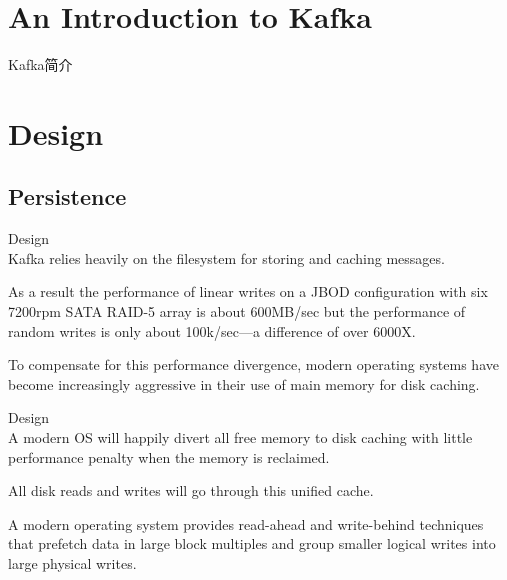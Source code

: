 \section{An Introduction to Kafka}
\begin{frame}[plain,t]{Kafka简介} %
	  \vspace{2ex}

	


	
\end{frame}

\section{Design}
\subsection{Persistence}
\begin{frame}[plain,t]{Design} %
     \\
    \vspace{2ex}
    Kafka relies heavily on the filesystem for storing and caching messages. 
    
    \vspace{2ex}
    As a result the performance of linear writes on a JBOD configuration with six 7200rpm SATA RAID-5 array is about 600MB/sec but the performance of random writes is only about 100k/sec—a difference of over 6000X. 
    
    \vspace{2ex}
    To compensate for this performance divergence, modern operating systems have become increasingly aggressive in their use of main memory for disk caching.
    
    
    
    
\end{frame}
\begin{frame}[plain,t]{Design} %
     \\
    \vspace{2ex}
    A modern OS will happily divert all free memory to disk caching with little performance penalty when the memory is reclaimed.
    
    \vspace{2ex}
    All disk reads and writes will go through this unified cache. 
    
    \vspace{2ex}
    A modern operating system provides read-ahead and write-behind techniques that prefetch data in large block multiples and group smaller logical writes into large physical writes.
    
    
\end{frame}
